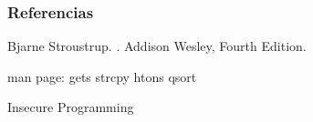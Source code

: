 \begin{frame}[allowframebreaks]
   \frametitle<presentation>{Referencias}

   \begin{thebibliography}{10}

         \beamertemplatebookbibitems

         Bjarne Stroustrup.
         .
         \newblock Addison Wesley, Fourth Edition.

         \beamertemplatearticlebibitems

         man page: gets strcpy htons qsort

         Insecure Programming


   \end{thebibliography}
\end{frame}




